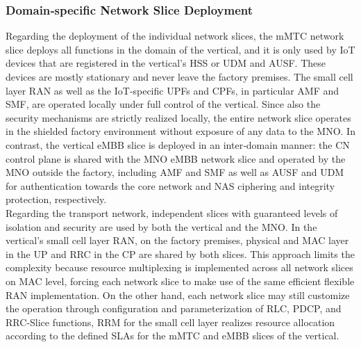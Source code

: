 \documentclass{report}
\begin{document}
\subsubsection{Domain‐specific Network Slice Deployment}
Regarding the deployment of the individual network slices, the mMTC network slice deploys all functions in the domain of the vertical, and it is only used by IoT
devices that are registered in the vertical’s \gls{HSS} or \gls{UDM} and \gls{AUSF}. These devices are mostly stationary and never
leave the factory premises. The small cell layer RAN as well as the IoT‐specific \gls{UPF}s and \gls{CPF}s, in particular \gls{AMF} and \gls{SMF}, are operated locally under full control of
the vertical. Since also the security mechanisms are strictly realized locally, the entire network slice operates in the shielded factory environment without exposure of any data to the MNO. In contrast, the vertical eMBB slice is deployed
in an inter‐domain manner: the CN control plane is shared with the MNO
eMBB network slice and operated by the MNO outside the factory, including AMF and SMF as well
as AUSF and \gls{UDM} for authentication towards the core network and \gls{NAS}
ciphering and integrity protection, respectively. \\
Regarding the transport network, independent slices
with guaranteed levels of isolation and security are used by both the vertical and the MNO. In the vertical’s small cell layer RAN, on the factory premises, physical and MAC layer in the UP
and \gls{RRC} in the CP are shared by both slices. This approach limits the complexity because resource
multiplexing is implemented across all network slices on MAC level, forcing each network slice to
make use of the same efficient flexible RAN implementation. On the other hand, each network slice
may still customize the operation through configuration and parameterization of \gls{RLC}, \gls{PDCP}, and RRC‐Slice functions, RRM for the small cell layer realizes resource allocation
according to the defined SLAs for the mMTC and eMBB slices of the vertical.
\end{document}
